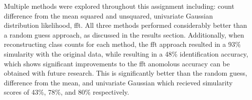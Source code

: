 Multiple methods were explored throughout this assignment including: count difference from the mean squared and unsquared,
univariate Gaussian distribution likelihood, fft. All three methods performed considerably better than a random guess approach,
as discussed in the results section. Additionally, when reconstructing class counts for each method, the fft approach resulted in
a 93\% simularity with the original data, while resulting in a 48\% identification accuracy, which shows significant improvements
to the fft anomolous accuracy can be obtained with future research. This is significantly better than the random guess,
difference from the mean, and univariate Gaussian which recieved simularity scores of 43\%, 78\%, and 80\% respectively.
